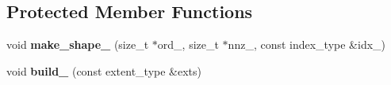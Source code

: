 \subsection*{Protected Member Functions}
\begin{DoxyCompactItemize}
\item 
\hypertarget{classbtas_1_1_sp_tensor_a46077eb6d2ccc05f7ff88c24d206ad5d}{
void {\bfseries make\_\-shape\_\-} (size\_\-t $\ast$ord\_\-, size\_\-t $\ast$nnz\_\-, const index\_\-type \&idx\_\-)}
\label{classbtas_1_1_sp_tensor_a46077eb6d2ccc05f7ff88c24d206ad5d}

\item 
\hypertarget{classbtas_1_1_sp_tensor_a7e267eba6cdb2dfc9f437a9fbbefeb8a}{
void {\bfseries build\_\-} (const extent\_\-type \&exts)}
\label{classbtas_1_1_sp_tensor_a7e267eba6cdb2dfc9f437a9fbbefeb8a}

\end{DoxyCompactItemize}
